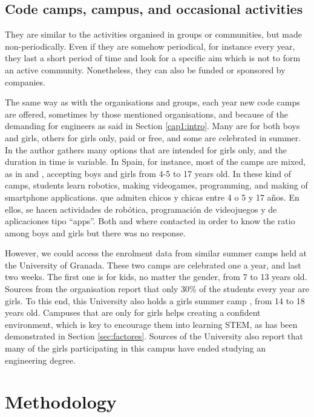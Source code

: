 \documentclass[journal,transmag]{IEEEtran}
\begin{document}
\subsection{Code camps, campus, and occasional activities}

They are similar to the activities organised in groups or communities, but made non-periodically. Even if they are somehow periodical, for instance every year, they last a short period of time and look for a specific aim which is not to form an active community. Nonetheless, they can also be funded or sponsored by companies. 

The same way as with the organisations and groups, each year new code camps are offered, sometimes by those mentioned organisations, and because of the demanding for engineers as said in Section \ref{cap1:intro}. Many are for both boys and girls, others for girls only, paid or free, and some are celebrated in summer. In \cite{lauren2015} the author gathers many options that are intended for girls only, and the duration in time is variable. In Spain, for instance, most of the camps are mixed, as in \cite{cmadrid:site} and \cite{cbcn:site}, accepting boys and girls from 4-5 to 17 years old. In these kind of camps, students learn robotics, making videogames, programming, and making of smartphone applications. que admiten chicos y chicas entre 4 o 5 y 17 años. En ellos, se hacen actividades de robótica, programación de videojuegos y de aplicaciones tipo ``apps''. Both  \cite{cmadrid:site} and \cite{cbcn:site} where contacted in order to know the ratio among boys and girls but there was no response.

However, we could access the enrolment data from similar summer camps held at the University of Granada. These two camps are celebrated one a year, and last two weeks. The first one \cite{cinfant:site} is for kids, no matter the gender, from 7 to 13 years old. Sources from the organisation report that only 30\% of the students every year are girls. To this end, this University also holds a girls summer camp \cite{cchicas:site}, from 14 to 18 years old. Campuses that are only for girls helps creating a confident environment, which is key to encourage them into learning STEM, as has been demonstrated in Section \ref{sec:factores}. Sources of the University also report that many of the girls participating in this campus have ended studying an engineering degree.

\section{Methodology}
\label{sec:metodologia}
\end{document}

